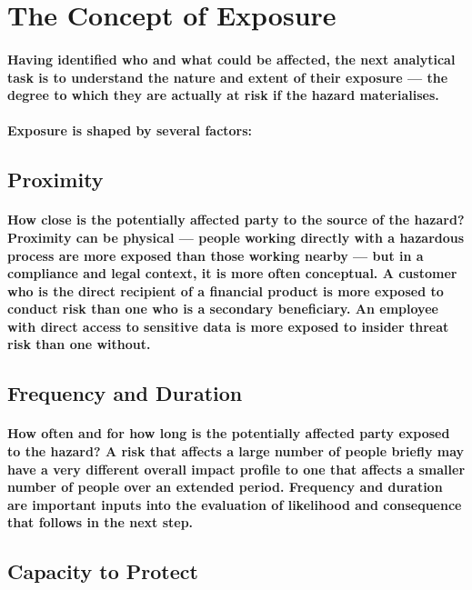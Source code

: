 \section{The Concept of Exposure}
\paragraph{Having identified who and what could be affected, the next analytical task is to understand the nature and extent of their \textbf{exposure} — the degree to which they are actually at risk if the hazard materialises.}
\paragraph{Exposure is shaped by several factors:}

\subsection{Proximity}
\paragraph{How close is the potentially affected party to the source of the hazard? Proximity can be physical — people working directly with a hazardous process are more exposed than those working nearby — but in a compliance and legal context, it is more often conceptual. A customer who is the direct recipient of a financial product is more exposed to conduct risk than one who is a secondary beneficiary. An employee with direct access to sensitive data is more exposed to insider threat risk than one without.}

\subsection{Frequency and Duration}
\paragraph{How often and for how long is the potentially affected party exposed to the hazard? A risk that affects a large number of people briefly may have a very different overall impact profile to one that affects a smaller number of people over an extended period. Frequency and duration are important inputs into the evaluation of likelihood and consequence that follows in the next step.}

\subsection{Capacity to Protect}
